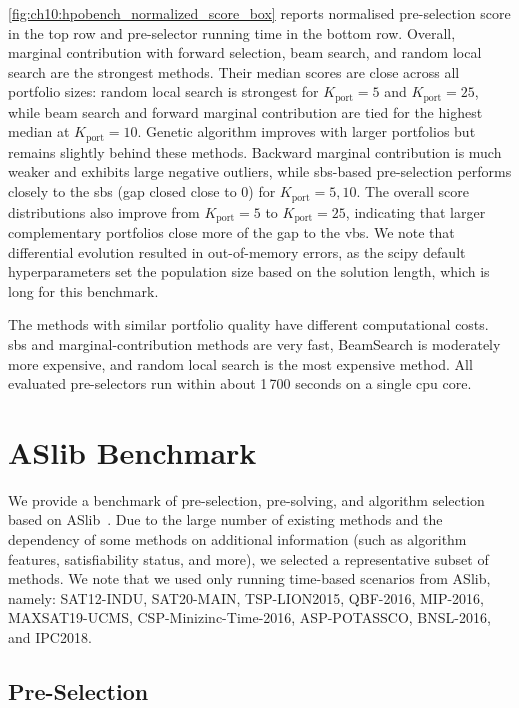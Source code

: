 \cref{fig:ch10:hpobench_normalized_score_box} reports normalised pre-selection score in the top row and pre-selector running time in the bottom row. Overall, marginal contribution with forward selection, beam search, and random local search are the strongest methods. Their median scores are close across all portfolio sizes: random local search is strongest for $K_{\mathrm{port}}=5$ and $K_{\mathrm{port}}=25$, while beam search and forward marginal contribution are tied for the highest median at $K_{\mathrm{port}}=10$. Genetic algorithm improves with larger portfolios but remains slightly behind these methods. Backward marginal contribution is much weaker and exhibits large negative outliers, while \gls{sbs}-based pre-selection performs closely to the \gls{sbs} (gap closed close to 0) for $K_{\mathrm{port}}=5,10$. The overall score distributions also improve from $K_{\mathrm{port}}=5$ to $K_{\mathrm{port}}=25$, indicating that larger complementary portfolios close more of the gap to the \gls{vbs}. We note that differential evolution resulted in out-of-memory errors, as the scipy default hyperparameters set the population size based on the solution length, which is long for this benchmark.

The methods with similar portfolio quality have different computational costs. \gls{sbs} and marginal-contribution methods are very fast, BeamSearch is moderately more expensive, and random local search is the most expensive method. All evaluated pre-selectors run within about 1\,700 seconds on a single \gls{cpu} core.

\section{ASlib Benchmark}
\label{sec:ch10:aslib_appendix}

We provide a benchmark of pre-selection, pre-solving, and algorithm selection based on ASlib~\citep{BisEtAl16}. Due to the large number of existing methods and the dependency of some methods on additional information (such as algorithm features, satisfiability status, and more), we selected a representative subset of methods.
We note that we used only running time-based scenarios from ASlib, namely: SAT12-INDU, SAT20-MAIN, TSP-LION2015, QBF-2016, MIP-2016, MAXSAT19-UCMS, CSP-Minizinc-Time-2016, ASP-POTASSCO, BNSL-2016, and IPC2018.

\subsection{Pre-Selection}

